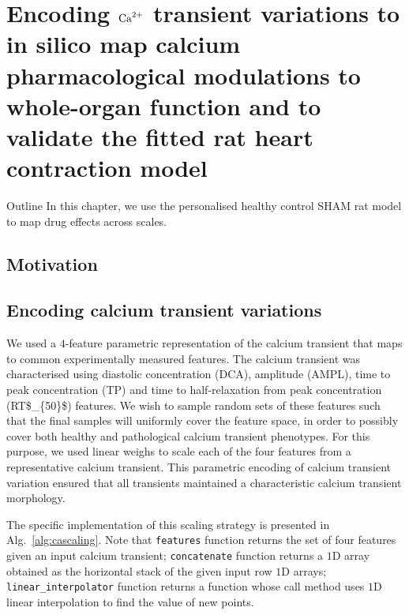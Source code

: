 \chapter{Encoding $\textrm{Ca}^{2+}$ transient variations to in silico map calcium pharmacological modulations to whole-organ function and to validate the fitted rat heart contraction model}\label{cha:chapter6}
%
%
%
\begin{remark}{Outline}
    In this chapter, we use the personalised healthy control SHAM rat model to map drug effects across scales. 
\end{remark}


%
%
%
\section{Motivation}\label{sec:ch6motivation}


%
%
%
\section{Encoding calcium transient variations}\label{sec:ch6encodingcalciumtransientvariations}
We used a $4$-feature parametric representation of the calcium transient that maps to common experimentally measured features. The calcium transient was characterised using diastolic concentration (\acs{DCA}), amplitude (\acs{AMPL}), time to peak concentration (\acs{TP}) and time to half-relaxation from peak concentration (\acs{RT$_{50}$}) features. We wish to sample random sets of these features such that the final samples will uniformly cover the feature space, in order to possibly cover both healthy and pathological calcium transient phenotypes. For this purpose, we used linear weighs to scale each of the four features from a representative calcium transient. This parametric encoding of calcium transient variation ensured that all transients maintained a characteristic calcium transient morphology.

\vspace{0.2cm}
The specific implementation of this scaling strategy is presented in Alg.~\ref{alg:cascaling}. Note that \texttt{features} function returns the set of four features given an input calcium transient; \texttt{concatenate} function returns a $1$D array obtained as the horizontal stack of the given input row $1$D arrays; \texttt{linear\_interpolator} function returns a function whose call method uses $1$D linear interpolation to find the value of new points.

